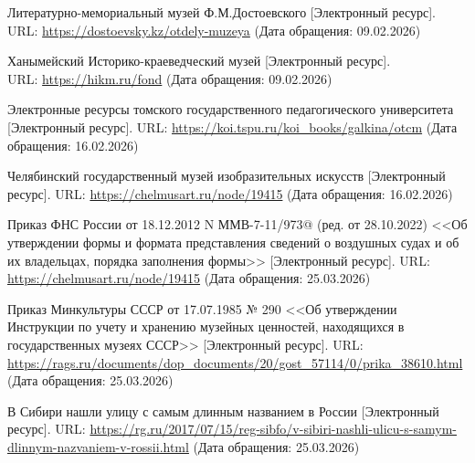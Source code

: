 \iffalse

 \par

\renewcommand{\refname}{Список использованных источников}
\begin{thebibliography}{}

     Литературно-мемориальный музей Ф.М.Достоевского [Электронный ресурс]. URL: \href{https://dostoevsky.kz/otdely-muzeya}{https://dostoevsky.kz/otdely-muzeya} (Дата обращения: 09.02.2026)

     Ханымейский Историко-краеведческий музей [Электронный ресурс]. \\ URL: \href{https://hikm.ru/fond.html}{https://hikm.ru/fond} (Дата обращения: 09.02.2026)

     Электронные ресурсы томского государственного педагогического университета [Электронный ресурс]. URL: \href{https://koi.tspu.ru/koi_books/galkina/otcm.htm}{https://koi.tspu.ru/koi\_books/galkina/otcm} (Дата обращения: 16.02.2026)

     Челябинский государственный музей изобразительных искусств [Электронный ресурс]. URL: \href{https://chelmusart.ru/node/19415}{https://chelmusart.ru/node/19415} (Дата обращения: 16.02.2026)

     Приказ ФНС России от 18.12.2012 N ММВ-7-11/973@ (ред. от 28.10.2022) <<Об утверждении формы и формата представления сведений о воздушных судах и об их владельцах, порядка заполнения формы>> [Электронный ресурс]. URL: \href{https://chelmusart.ru/node/19415}{https://chelmusart.ru/node/19415} (Дата обращения: 25.03.2026)

     Приказ Минкультуры СССР от 17.07.1985 № 290 <<Об утверждении Инструкции по учету и хранению музейных ценностей, находящихся в государственных музеях СССР>> [Электронный ресурс]. URL: \href{https://rags.ru/documents/dop_documents/20/gost_57114/0/prika_38610.html}{https://rags.ru/documents/dop\_documents/20/gost\_57114/0/prika\_38610.html} (Дата обращения: 25.03.2026)

     В Сибири нашли улицу с самым длинным названием в России
     [Электронный ресурс]. URL: \href{https://rg.ru/2017/07/15/reg-sibfo/v-sibiri-nashli-ulicu-s-samym-dlinnym-nazvaniem-v-rossii.html}{https://rg.ru/2017/07/15/reg-sibfo/v-sibiri-nashli-ulicu-s-samym-dlinnym-nazvaniem-v-rossii.html} (Дата обращения: 25.03.2026)


\end{thebibliography}
